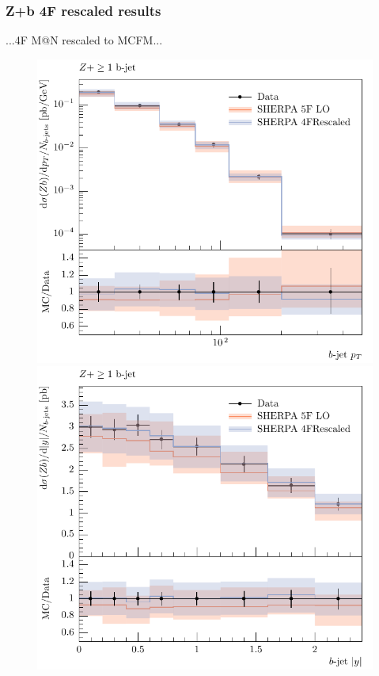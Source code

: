 \documentclass[11pt]{cernrep} \usepackage{graphicx,epsfig} 
\makeatletter
\newcommand{\MCatNLO}{M\protect\scalebox{0.8}{C}@N\protect\scalebox{0.8}{LO}\xspace}
\makeatother
\begin{document}
\subsubsection{Z+b 4F rescaled results}
...4F \MCatNLO rescaled to MCFM...
\begin{figure}[htbp]
   \includegraphics[scale=0.5]{figs/zbb/d03-x01-y01_rescaled.pdf} 
   \includegraphics[scale=0.5]{figs/zbb/d05-x01-y01_rescaled.pdf} 
\end{figure}
\end{document}
